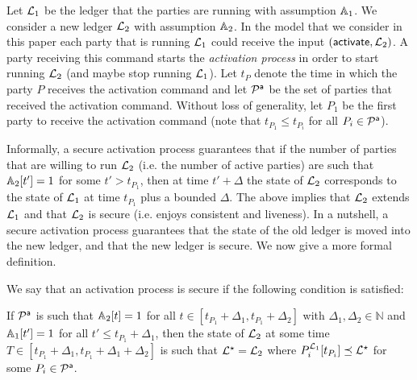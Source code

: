 Let $\mathcal{L}_1$ be the ledger that the parties are running with assumption $\mathbb{A}_1$. We consider a new ledger $\mathcal{L}_2$ with assumption $\mathbb{A}_2$.
In the model that we consider in this paper each party that is running $\mathcal{L}_1$ could receive the input $(\mathsf{activate}, \mathcal{L}_2)$. A party receiving this command starts the \emph{activation process}
in order to start running $\mathcal{L}_2$ (and maybe stop running $\mathcal{L}_1$). Let $t_P$ denote the time in which 
the party $P$ receives the activation command and let $\mathcal{P}^\mathsf{a}$ be the set of parties that received the activation command. Without loss of generality, let $P_1$ be the first party to receive the activation command (note that $t_{P_1}\leq t_{P_i}$ for all $P_i\in\mathcal{P}^\mathsf{a}$).

Informally, a secure activation process guarantees that if the number of parties that are willing to run $\mathcal{L}_2$ (i.e. the number of active parties)  
are such that $\mathbb{A}_2[t']=1$ for some $t'>t_{P_1}$, then at time $t'+\Delta$ the state of $\mathcal{L}_2$ corresponds to the state of $\mathcal{L}_1$ at time $t_{P_1}$ plus
a bounded $\Delta$. 
The above implies that $\mathcal{L}_2$ extends $\mathcal{L}_1$ and that $\mathcal{L}_2$ is secure (i.e. enjoys consistent and liveness).
In a nutshell, a secure activation process guarantees that the state of the old ledger is moved into the new ledger, and that the new ledger is secure.
We now give a more formal definition.

\begin{definition}
 We say that an activation process is secure if the following condition is satisfied:

If $\mathcal{P}^\mathsf{a}$ is such that $\mathbb{A}_2[t]=1$ for all $t\in [t_{P_1}+\Delta_1, t_{P_1}+\Delta_2]$ with $\Delta_1,\Delta_2\in\mathbb{N}$
	and $\mathbb{A}_1[t']=1$ for all $t' \leq t_{P_1}+\Delta_1$, then the state of $\mathcal{L}_2$ at some time $T\in [t_{P_1}+\Delta_1, t_{P_1}+\Delta_1+\Delta_2]$ is such that $\mathcal{L}^\star=\mathcal{L}_2$
	where $  P_i^{\mathcal{L}_1}[t_{P_i}] \preceq \mathcal{L}^\star$ for some $P_i\in\mathcal{P}^\mathsf{a}$.  
\end{definition}






